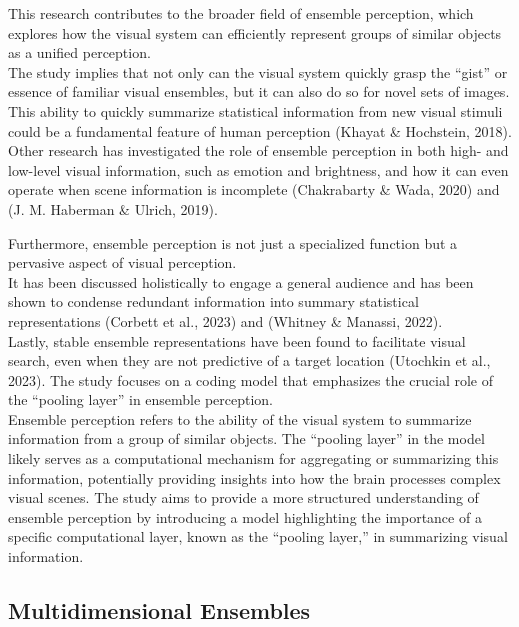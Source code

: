\documentclass[print]{nuthesis}
\begin{document}
This research contributes to the broader field of ensemble perception, which explores how the visual system can efficiently represent groups of similar objects as a unified perception.\\
The study implies that not only can the visual system quickly grasp the ``gist'' or essence of familiar visual ensembles, but it can also do so for novel sets of images.\\
This ability to quickly summarize statistical information from new visual stimuli could be a fundamental feature of human perception (Khayat \& Hochstein, 2018).\\
Other research has investigated the role of ensemble perception in both high- and low-level visual information, such as emotion and brightness, and how it can even operate when scene information is incomplete (Chakrabarty \& Wada, 2020) and (J. M. Haberman \& Ulrich, 2019).

Furthermore, ensemble perception is not just a specialized function but a pervasive aspect of visual perception.\\
It has been discussed holistically to engage a general audience and has been shown to condense redundant information into summary statistical representations (Corbett et al., 2023) and (Whitney \& Manassi, 2022).\\
Lastly, stable ensemble representations have been found to facilitate visual search, even when they are not predictive of a target location (Utochkin et al., 2023).
The study focuses on a coding model that emphasizes the crucial role of the ``pooling layer'' in ensemble perception.\\
Ensemble perception refers to the ability of the visual system to summarize information from a group of similar objects.
The ``pooling layer'' in the model likely serves as a computational mechanism for aggregating or summarizing this information, potentially providing insights into how the brain processes complex visual scenes.
The study aims to provide a more structured understanding of ensemble perception by introducing a model highlighting the importance of a specific computational layer, known as the ``pooling layer,'' in summarizing visual information.

\hypertarget{multidimensional-ensembles-1}{%
\subsection{Multidimensional Ensembles}\label{multidimensional-ensembles-1}}
\end{document}
